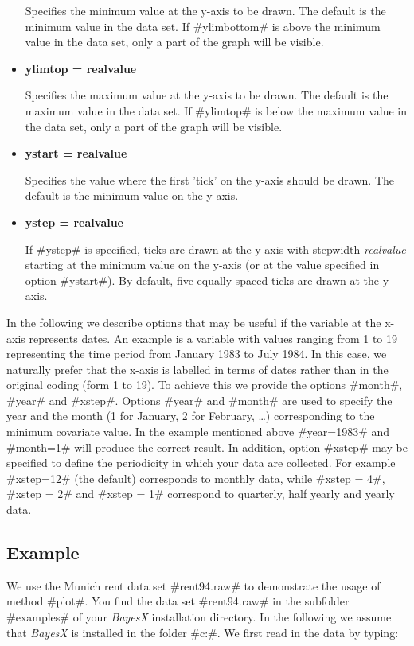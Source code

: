 \begin{itemize}
Specifies the minimum value at the y-axis to be drawn. The default
is the minimum value in the data set. If #ylimbottom# is above the
minimum value in the data set, only a part of the  graph will be
visible. \item {\bf ylimtop = realvalue}

Specifies the maximum value at the y-axis to be drawn. The default
is the maximum value in the data set. If #ylimtop# is below the
maximum value in the data set, only a part of the  graph will be
visible.
\item {\bf ystart = realvalue}

Specifies the value where the first 'tick' on the y-axis should be
drawn. The default is the minimum value on the y-axis.
\item {\bf ystep = realvalue}

If #ystep# is specified,  ticks are drawn at the y-axis with
stepwidth {\em realvalue} starting at the minimum value on the
y-axis (or at the value specified in option #ystart#). By default,
five equally spaced ticks are drawn at the y-axis.
\end{itemize}

In the following we describe options that may be useful if the
variable at the x-axis represents dates. An example is a variable
with values ranging from 1 to 19 representing the time period from
January 1983 to July 1984. In this case, we naturally prefer that
the x-axis is labelled in terms of dates rather than in the
original coding (form 1 to 19). To achieve this we provide the
options #month#, #year# and #xstep#. Options #year# and #month#
are used to specify the year and the month (1 for January, 2 for
February, \dots) corresponding to the minimum covariate value. In
the example mentioned above #year=1983# and #month=1# will produce the
correct result. In addition, option #xstep# may be specified to
define the periodicity in which your data are collected. For
example #xstep=12# (the default) corresponds to monthly data,
while #xstep = 4#, #xstep = 2# and #xstep = 1# correspond to
quarterly, half yearly and yearly data.


\subsection*{Example}

We use the Munich rent data set #rent94.raw# to demonstrate the
usage of method #plot#. You find the data set #rent94.raw# in the
subfolder #examples# of your {\em BayesX} installation directory.
In the following we assume that {\em BayesX} is installed in the
folder #c:\bayesx#.
We first read in the data by typing:


